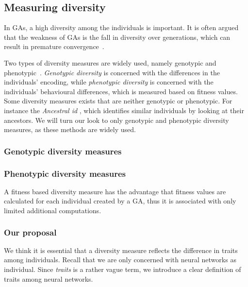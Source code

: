\subsection{Measuring diversity}
In GAs, a high diversity among the individuals is important. It is often argued that the weakness of GAs is the fall in diversity over generations, which can result in premature convergence~\cite{diaz2007empirical, 1266373,Zitzler00comparisonof}.

Two types of diversity measures are widely used, namely genotypic and phenotypic~\cite{Nguyen:2006:ASPGP,1250187}.
\emph{Genotypic diversity} is concerned with the differences in the individuals' encoding, while \emph{phenotypic diversity} is concerned with the individuals' behavioural differences, which is measured based on fitness values.
Some diversity measures exists that are neither genotypic or phenotypic. For instance the \emph{Ancestral id}\cite{INSERT CITATION}%
, which identifies similar individuals by looking at their ancestors. We will turn our look to only genotypic and phenotypic diversity measures, as these methods are widely used.


\subsubsection{Genotypic diversity measures}

\subsubsection{Phenotypic diversity measures}
A fitness based diversity measure has the advantage that fitness values are calculated for each individual created by a GA, thus it is associated with only limited additional computations\cite{Nguyen:2006:ASPGP}.

\subsubsection{Our proposal}
We think it is essential that a diversity measure reflects the difference in traits among individuals. Recall that we are only concerned with neural networks as individual. Since \emph{traits} is a rather vague term, we introduce a clear definition of traits among neural networks.

